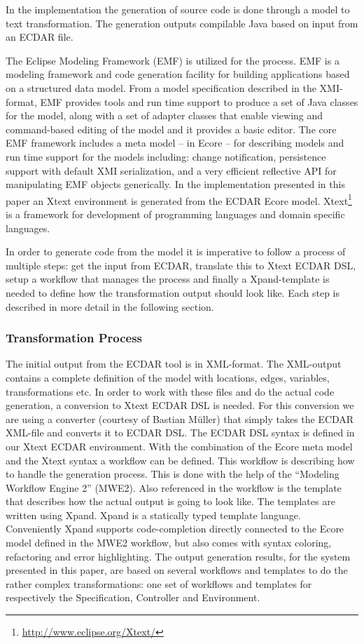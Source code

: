 In the implementation the generation of source code is done
through a model to text transformation. The generation outputs compilable
Java based on input from an ECDAR file.

The Eclipse Modeling Framework (EMF) is utilized for the process. EMF is a
modeling framework and code generation facility for building applications based
on a structured data model. From a model specification described in the
XMI-format, EMF provides tools and run time support to produce a set of Java
classes for the model, along with a set of adapter classes that enable viewing
and command-based editing of the model and it provides a basic editor. The core
EMF framework includes a meta model -- in Ecore -- for describing models and run
time support for the models including: change notification, persistence support
with default XMI serialization, and a very efficient reflective API for
manipulating EMF objects generically. In the implementation presented in this
paper an Xtext environment is generated from the ECDAR Ecore
model. Xtext\footnote{\url{http://www.eclipse.org/Xtext/}} is a framework for
development of programming languages and domain specific languages.

In order to generate code from the model it is imperative to follow a process of
multiple steps: get the input from ECDAR, translate this to Xtext ECDAR DSL,
setup a workflow that manages the process and finally a Xpand-template is needed
to define how the transformation output should look like. Each step is described
in more detail in the following section.

\subsubsection{Transformation Process}
\label{transformation-process}

The initial output from the ECDAR tool is in XML-format. The XML-output contains
a complete definition of the model with locations, edges, variables,
transformations etc. In order to work with these files and do the actual code
generation, a conversion to Xtext ECDAR DSL is needed. For this conversion we
are using a converter (courtesy of Bastian M\"uller) that simply takes the ECDAR
XML-file and converts it to ECDAR DSL. The ECDAR DSL syntax is defined in our
Xtext ECDAR environment. With the combination of the Ecore meta model and the
Xtext syntax a workflow can be defined. This workflow is describing how to
handle the generation process. This is done with the help of the ``Modeling
Workflow Engine 2'' (MWE2). Also referenced in the workflow is the template that
describes how the actual output is going to look like. The templates are written
using Xpand. Xpand is a statically typed template language. Conveniently Xpand
supports code-completion directly connected to the Ecore model defined in the
MWE2 workflow, but also comes with syntax coloring, refactoring and error
highlighting. The output generation results, for the system presented in this
paper, are based on several workflows and templates to do the rather complex
transformations: one set of workflows and templates for respectively the
Specification, Controller and Environment.

